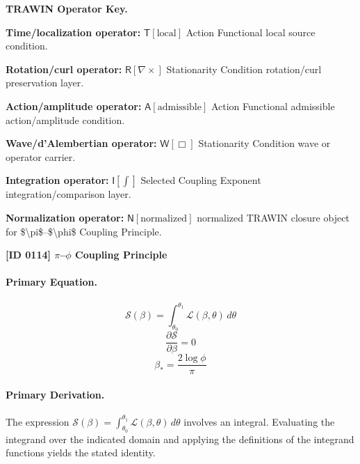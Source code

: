\par\vspace{0.45\baselineskip}
\noindent\begin{minipage}[t]{\linewidth}
\begingroup
\small
\raggedright
\textbf{TRAWIN Operator Key.}\par
\noindent\textbf{Time/localization operator:} $\mathsf{T}\!\left[\mathrm{local}\right]$ Action Functional local source condition.\par
\noindent\textbf{Rotation/curl operator:} $\mathsf{R}\!\left[\nabla\times\right]$ Stationarity Condition rotation/curl preservation layer.\par
\noindent\textbf{Action/amplitude operator:} $\mathsf{A}\!\left[\mathrm{admissible}\right]$ Action Functional admissible action/amplitude condition.\par
\noindent\textbf{Wave/d'Alembertian operator:} $\mathsf{W}\!\left[\Box\right]$ Stationarity Condition wave or operator carrier.\par
\noindent\textbf{Integration operator:} $\mathsf{I}\!\left[\int\right]$ Selected Coupling Exponent integration/comparison layer.\par
\noindent\textbf{Normalization operator:} $\mathsf{N}\!\left[\mathrm{normalized}\right]$ normalized TRAWIN closure object for \$\textbackslash{}pi\$--\$\textbackslash{}phi\$ Coupling Principle.\par
\endgroup
\end{minipage}

\clearpage
\noindent\textbf{[ID 0114] $\pi$--$\phi$ Coupling Principle}\par
\vspace{0.35em}
\paragraph{Primary Equation.}
\[
\mathcal{S}(\beta)=\int_{\theta_0}^{\theta_1}\mathcal{L}(\beta,\theta)\,d\theta
\]
\[
\frac{\partial \mathcal{S}}{\partial \beta}=0
\]
\[
\beta_{\ast}=\frac{2\log \phi}{\pi}
\]

\paragraph{Primary Derivation.}
The expression \( \mathcal{S}(\beta)=\int_{\theta_0}^{\theta_1}\mathcal{L}(\beta,\theta)\,d\theta \) involves an integral. Evaluating the integrand over the indicated domain and applying the definitions of the integrand functions yields the stated identity.
